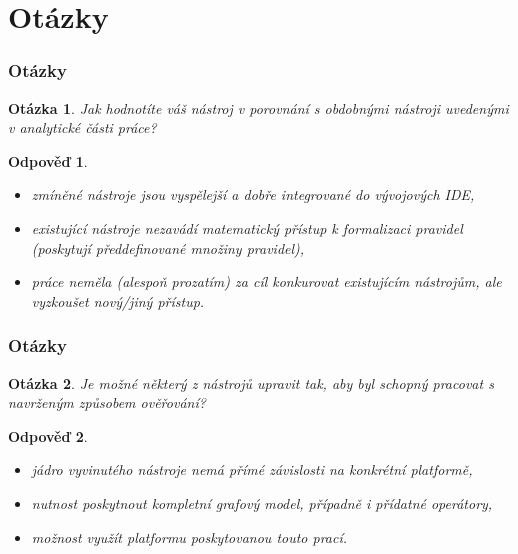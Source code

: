 \documentclass{beamer}
\newtheorem*{question}{Otázka}
\newtheorem*{response}{Odpověď}
\begin{document}
\section{Otázky}
\begin{frame}
  \frametitle{Otázky}
  \begin{question}
    Jak hodnotíte váš nástroj v porovnání s obdobnými nástroji uvedenými v analytické části práce?
  \end{question}
  \begin{response}
    \begin{itemize}
    \item zmíněné nástroje jsou vyspělejší a dobře integrované do vývojových IDE,
    \item existující nástroje nezavádí matematický přístup k formalizaci pravidel (poskytují předdefinované množiny pravidel),
    \item práce neměla (alespoň prozatím) za cíl konkurovat existujícím nástrojům, ale vyzkoušet nový/jiný přístup.
    \end{itemize}
  \end{response}
\end{frame}

\begin{frame}
  \frametitle{Otázky}
  \begin{question}
    Je možné některý z nástrojů upravit tak, aby byl schopný pracovat s navrženým způsobem ověřování?
  \end{question}
  \begin{response}
    \begin{itemize}
    \item jádro vyvinutého nástroje nemá přímé závislosti na konkrétní platformě,
    \item nutnost poskytnout kompletní grafový model, případně i přídatné operátory,
    \item možnost využít platformu poskytovanou touto prací.
\end{itemize}
  \end{response}
\end{frame}
\end{document}
